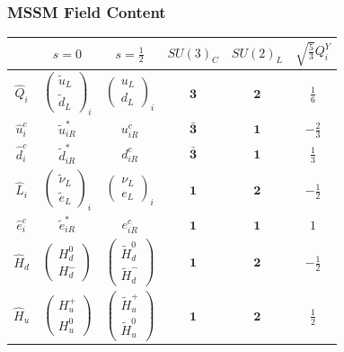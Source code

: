 \documentclass[10pt,aspectratio=169]{beamer}
\begin{document}
\begin{frame}
  \frametitle{MSSM Field Content}
  \begin{table}[h]
    \centering
    \small
    \begin{tabular}{cccccc}
      \toprule
      & $s = 0$ & $s = \frac{1}{2}$ & $SU(3)_C$ & $SU(2)_L$
      & $\sqrt{\frac{5}{3}} Q_i^Y$ \\
      \midrule
      $\hat{Q}_i$ & $\begin{pmatrix} \tilde{u}_{L} \\
        \tilde{d}_{L} \end{pmatrix}_i$
      & $\begin{pmatrix} u_{L} \\ d_L\end{pmatrix}_i$
        & $\mathbf{3}$ & $\mathbf{2}$ & $\frac{1}{6}$ \\[1em]
        $\hat{u}^c_i$ & $\tilde{u}^*_{iR}$ & $u^c_{iR}$
        & $\bar{\mathbf{3}}$ & $\mathbf{1}$ & $-\frac{2}{3}$ \\[0.5em]
        $\hat{d}^c_i$ & $\tilde{d}^*_{iR}$ & $d^c_{iR}$
        & $\bar{\mathbf{3}}$ & $\mathbf{1}$ & $\frac{1}{3}$ \\[0.5em]
        $\hat{L}_i$ & $\begin{pmatrix} \tilde{\nu}_{L} \\
          \tilde{e}_{L} \end{pmatrix}_i$
        & $\begin{pmatrix} \nu_{L}\\ e_L \end{pmatrix}_i$
        & $\mathbf{1}$ & $\mathbf{2}$ & $-\frac{1}{2}$ \\[1em]
        $\hat{e}^c_i$ & $\tilde{e}^*_{iR}$ & $e^c_{iR}$
        & $\mathbf{1}$ & $\mathbf{1}$ & $1$ \\[0.5em]
        $\hat{H}_d$ & $\begin{pmatrix} H_d^0 \\ H_d^- \end{pmatrix}$
        & $\begin{pmatrix} \tilde{H}_d^0 \\ \tilde{H}_d^- \end{pmatrix}$
        & $\mathbf{1}$ & $\mathbf{2}$ & $-\frac{1}{2}$ \\[1em]
        $\hat{H}_u$ & $\begin{pmatrix} H_u^+ \\ H_u^0 \end{pmatrix}$
        & $\begin{pmatrix} \tilde{H}_u^+ \\ \tilde{H}_u^0 \end{pmatrix}$
        & $\mathbf{1}$ & $\mathbf{2}$ & $\frac{1}{2}$ \\[1em]
        \bottomrule
    \end{tabular}
  \end{table}
\end{frame}
\end{document}
